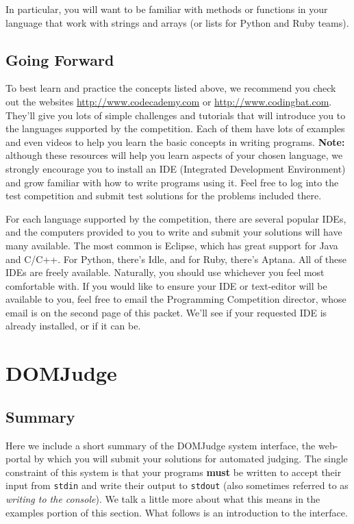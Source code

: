\documentclass[a4paper]{article}
\begin{document}
In particular, you will want to be familiar with methods or functions in your language that work with strings and arrays (or lists for Python and Ruby teams).

\subsection{Going Forward}
To best learn and practice the concepts listed above, we recommend you check out the websites \url{http://www.codecademy.com} or \url{http://www.codingbat.com}. They'll give you lots of simple challenges and tutorials that will introduce you to the languages supported by the competition. Each of them have lots of examples and even videos to help you learn the basic concepts in writing programs. \textbf{Note:} although these resources will help you learn aspects of your chosen language, we strongly encourage you to install an IDE (Integrated Development Environment) and grow familiar with how to write programs using it. Feel free to log into the test competition and submit test solutions for the problems included there. 

For each language supported by the competition, there are several popular IDEs, and the computers provided to you to write and submit your solutions will have many available. The most common is Eclipse, which has great support for Java and C/C++. For Python, there's Idle, and for Ruby, there's Aptana. All of these IDEs are freely available. Naturally, you should use whichever you feel most comfortable with. If you would like to ensure your IDE or text-editor will be available to you, feel free to email the Programming Competition director, whose email is on the second page of this packet. We'll see if your requested IDE is already installed, or if it can be. 
\newpage

\section{DOMJudge}

\subsection{Summary}
Here we include a short summary of the DOMJudge system interface, the web-portal by which you will submit your solutions for automated judging. The single constraint of this system is that your programs \textbf{must} be written to accept their input from \texttt{stdin} and write their output to \texttt{stdout} (also sometimes referred to as \textit{writing to the console}). We talk a little more about what this means in the examples portion of this section. What follows is an introduction to the interface.
\end{document}
